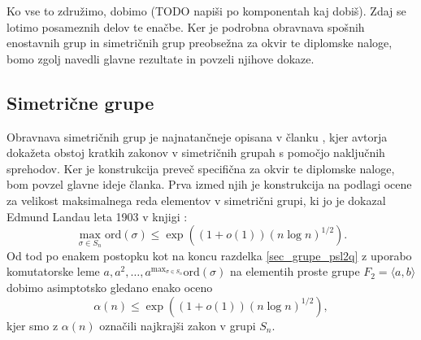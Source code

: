 \documentclass[mat1, tisk]{fmfdelo}
\numberwithin{equation}{section}  %
\begin{document}

Ko vse to združimo, dobimo (TODO napiši po komponentah kaj dobiš). Zdaj se lotimo posameznih delov te enačbe. Ker je podrobna obravnava spošnih enostavnih grup in simetričnih grup preobsežna za okvir te diplomske naloge, bomo zgolj navedli glavne rezultate in povzeli njihove dokaze.

\subsection{Simetrične grupe}


Obravnava simetričnih grup je najnatančneje opisana v članku \cite{Kozma_Thom_2016}, kjer avtorja dokažeta obstoj kratkih zakonov v simetričnih grupah s pomočjo naključnih sprehodov.
Ker je konstrukcija preveč specifična za okvir te diplomske naloge, bom povzel glavne ideje članka. Prva izmed njih je konstrukcija na podlagi ocene za velikost maksimalnega reda elementov v simetrični grupi,
ki jo je dokazal Edmund Landau leta 1903 v knjigi \cite{Landau_1903}: \begin{equation*}
\max_{\sigma \in S_n} \text{ord}(\sigma) \le \exp((1 + o(1)) (n \log n)^{1 / 2}).
\end{equation*}  
Od tod po enakem postopku kot na koncu razdelka \ref{sec_grupe_psl2q} z uporabo komutatorske leme $a, a^2, \ldots, a^{\max_{\sigma \in S_n}} \text{ord}(\sigma)$ na elementih proste grupe $F_2 = \langle a, b \rangle$ dobimo asimptotsko gledano enako oceno \begin{equation*}
    \alpha(n)  \le \exp((1 + o(1)) (n \log n)^{1 / 2}),
\end{equation*}  
kjer smo z $\alpha(n)$ označili najkrajši zakon v grupi $S_n$.
\end{document}
